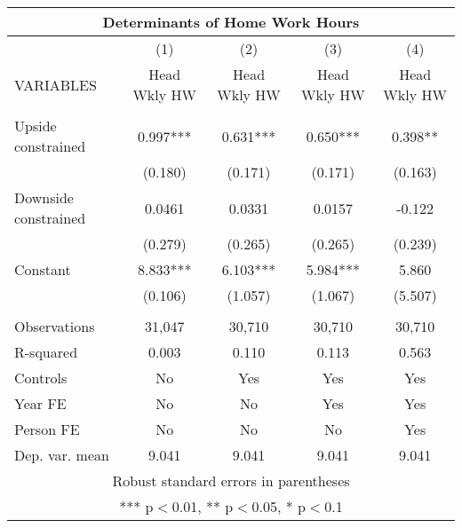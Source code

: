 \begin{tabular}{lcccc}
\multicolumn{5}{c}{Determinants of Home Work Hours} \\ \hline
 & (1) & (2) & (3) & (4) \\
VARIABLES & Head Wkly HW & Head Wkly HW & Head Wkly HW & Head Wkly HW \\ \hline
 &  &  &  &  \\
Upside constrained & 0.997*** & 0.631*** & 0.650*** & 0.398** \\
 & (0.180) & (0.171) & (0.171) & (0.163) \\
Downside constrained & 0.0461 & 0.0331 & 0.0157 & -0.122 \\
 & (0.279) & (0.265) & (0.265) & (0.239) \\
Constant & 8.833*** & 6.103*** & 5.984*** & 5.860 \\
 & (0.106) & (1.057) & (1.067) & (5.507) \\
 &  &  &  &  \\
Observations & 31,047 & 30,710 & 30,710 & 30,710 \\
R-squared & 0.003 & 0.110 & 0.113 & 0.563 \\
Controls & No & Yes & Yes & Yes \\
Year FE & No & No & Yes & Yes \\
Person FE & No & No & No & Yes \\
 Dep. var. mean & 9.041 & 9.041 & 9.041 & 9.041 \\ \hline
\multicolumn{5}{c}{ Robust standard errors in parentheses} \\
\multicolumn{5}{c}{ *** p$<$0.01, ** p$<$0.05, * p$<$0.1} \\
\end{tabular}

